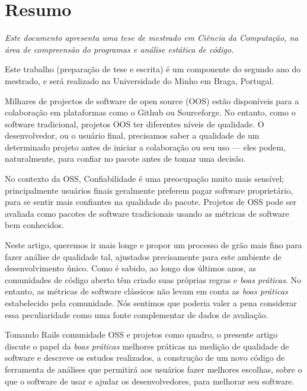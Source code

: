 \thispagestyle{plain}
\chapter*{Resumo}\label{chap:resumo}


{\it
  Este documento apresenta uma tese de mestrado em Ciência da Computação, 
  na área de \textit{compreensão do programas e análise estática de código}.

  Este trabalho (preparação de tese e escrita) é um componente do segundo ano do mestrado,
  e será realizado na Universidade do Minho em Braga, Portugal.

  Milhares de projectos de software de open source (OOS) estão disponíveis para a colaboração 
  em plataformas como o Github ou Sourceforge.
  No entanto, como o software tradicional, projetos OOS ter diferentes níveis de qualidade.
  O desenvolvedor, ou o usuário final, precisamos saber a qualidade de um determinado projeto antes de iniciar a colaboração
  ou seu uso --- eles podem, naturalmente, para confiar no pacote antes de tomar uma decisão.
  
  No contexto da OSS, Confiabilidade é uma preocupação muito mais sensível; principalmente usuários finais geralmente preferem pagar
  software proprietário, para se sentir mais confiantes na qualidade do pacote.
  Projetos de OSS pode ser avaliada como pacotes de software tradicionais usando as métricas de software bem conhecidos.
  
  Neste artigo, queremos ir mais longe e propor um processo de grão mais fino para fazer análise de qualidade tal,
  ajustados precisamente para este ambiente de desenvolvimento único.
  Como é sabido, ao longo dos últimos anos, as comunidades de código aberto têm criado suas próprias regras e \emph{boas práticas}.
  No entanto, as métricas de software clássicos não levam em conta as \emph{boas práticas}
  estabelecido pela comunidade.
  Nós sentimos que poderia valer a pena considerar essa peculiaridade como uma fonte complementar de dados de avaliação.
  
  Tomando Rails comunidade OSS e projetos como quadro, o presente artigo discute o papel da
  \emph{boas práticas} melhores práticas na medição de qualidade de software e descreve os estudos realizados, 
  a construção de um novo código de ferramenta de análises que
  permitirá aos usuários fazer melhores escolhas, sobre o que o software de usar e ajudar os desenvolvedores, 
  para melhorar seu software.
}
